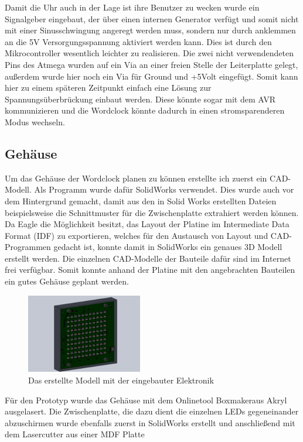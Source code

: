 \documentclass[12pt,journal,compsoc]{IEEEtran}
\begin{document}
Damit die Uhr auch in der Lage ist ihre Benutzer zu wecken wurde ein Signalgeber eingebaut, der über einen internen Generator verfügt und somit nicht mit einer Sinusschwingung angeregt werden muss, sondern nur durch anklemmen an die 5V Versorgungsspannung aktiviert werden kann. Dies ist durch den Mikrocontroller wesentlich leichter zu realisieren.
Die zwei nicht verwendendeten Pins des Atmega wurden auf ein Via an einer freien Stelle der Leiterplatte gelegt, außerdem wurde hier noch ein Via für Ground und +5Volt eingefügt. Somit kann hier zu einem späteren Zeitpunkt einfach eine Lösung zur Spannungsüberbrückung einbaut werden. Diese könnte sogar mit dem AVR kommunizieren und die Wordclock könnte dadurch in einen stromsparenderen Modus wechseln.  


\subsection{Gehäuse}
Um das Gehäuse der Wordclock planen zu können erstellte ich zuerst ein CAD-Modell. Als Programm wurde dafür SolidWorks verwendet. Dies wurde auch vor dem Hintergrund gemacht, damit aus den in Solid Works erstellten Dateien beispielsweise die Schnittmuster für die Zwischenplatte extrahiert werden können. Da Eagle die Möglichkeit besitzt, das Layout der Platine im Intermediate Data Format  (IDF) zu exportieren, welches für den Austausch von Layout und CAD-Programmen gedacht ist, konnte damit in SolidWorks ein genaues 3D Modell erstellt werden. Die einzelnen CAD-Modelle der Bauteile dafür sind im Internet frei verfügbar. Somit konnte anhand der Platine mit den angebrachten Bauteilen ein gutes Gehäuse geplant werden. 
\begin{figure}[]
	\centering
	\includegraphics[width=0.45\textwidth]{Bilder/SW2}
	\caption{Das erstellte Modell mit der eingebauter Elektronik} 
	\label{fig:SW2}
\end{figure}
Für den Prototyp wurde das Gehäuse mit dem Onlinetool \glqq Boxmaker\grqq aus Akryl ausgelasert. Die Zwischenplatte, die dazu dient die einzelnen LEDs gegeneinander abzuschirmen wurde ebenfalls zuerst in SolidWorks erstellt und anschließend mit dem Lasercutter aus einer MDF Platte 
\end{document}
